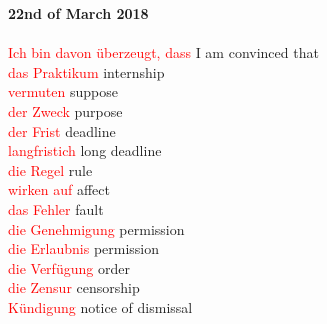 \documentclass{article}
\begin{document}
	\textbf{22nd of March 2018}\\\\
	\textcolor{red}{Ich bin davon überzeugt, dass} I am convinced that\\
	\textcolor{red}{das Praktikum} internship\\
	\textcolor{red}{vermuten} suppose\\
	\textcolor{red}{der Zweck} purpose\\
	\textcolor{red}{der Frist} deadline\\
	\textcolor{red}{langfristich} long deadline\\
	\textcolor{red}{die Regel} rule\\
	\textcolor{red}{wirken auf} affect\\
	\textcolor{red}{das Fehler} fault\\
	\textcolor{red}{die Genehmigung} permission\\
	\textcolor{red}{die Erlaubnis} permission\\
	\textcolor{red}{die Verfügung} order\\
	\textcolor{red}{die Zensur} censorship\\
	\textcolor{red}{Kündigung} notice of dismissal\\\\
	
\end{document}
